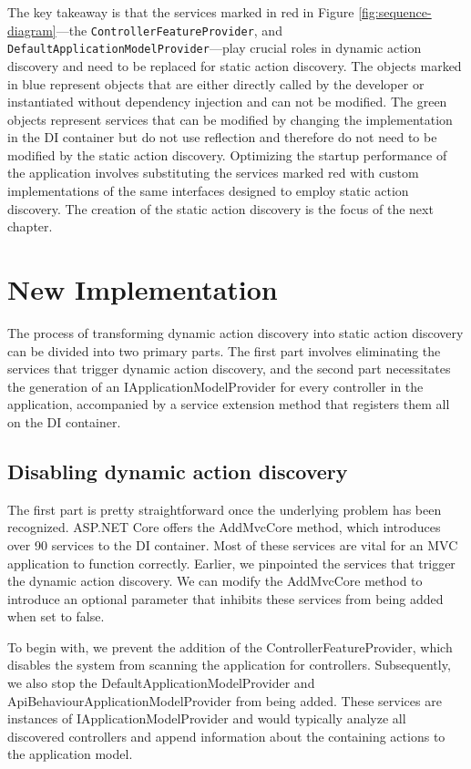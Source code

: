 The key takeaway is that the services marked in red in Figure \ref{fig:sequence-diagram}—the \texttt{ControllerFeatureProvider}, and \texttt{DefaultApplicationModelProvider}—play crucial roles in dynamic action discovery and need to be replaced for static action discovery. The objects marked in blue represent objects that are either directly called by the developer or instantiated without dependency injection and can not be modified. The green objects represent services that can be modified by changing the implementation in the DI container but do not use reflection and therefore do not need to be modified by the static action discovery. Optimizing the startup performance of the application involves substituting the services marked red with custom implementations of the same interfaces designed to employ static action discovery. The creation of the static action discovery is the focus of the next chapter.

\section{New Implementation}

The process of transforming dynamic action discovery into static action discovery can be divided into two primary parts. The first part involves eliminating the services that trigger dynamic action discovery, and the second part necessitates the generation of an IApplicationModelProvider for every controller in the application, accompanied by a service extension method that registers them all on the DI container.

\subsection{Disabling dynamic action discovery}

The first part is pretty straightforward once the underlying problem has been recognized. ASP.NET Core offers the AddMvcCore method, which introduces over 90 services to the DI container. Most of these services are vital for an MVC application to function correctly. Earlier, we pinpointed the services that trigger the dynamic action discovery. We can modify the AddMvcCore method to introduce an optional parameter that inhibits these services from being added when set to false.

To begin with, we prevent the addition of the ControllerFeatureProvider, which disables the system from scanning the application for controllers. Subsequently, we also stop the DefaultApplicationModelProvider and ApiBehaviourApplicationModelProvider from being added. These services are instances of IApplicationModelProvider and would typically analyze all discovered controllers and append information about the containing actions to the application model.

